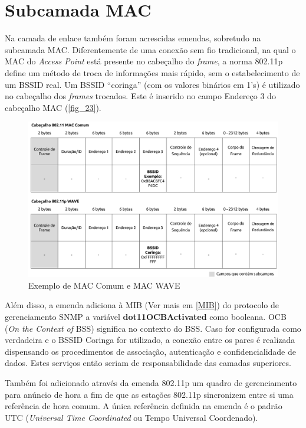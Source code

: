 \documentclass[
12pt,				%
openright,			%
oneside,			%
a4paper,			%
brazil,				%
]{abntex2}
\begin{document}
	\section{Subcamada MAC}
	
	\par Na camada de enlace também foram acrescidas emendas, sobretudo na subcamada MAC. Diferentemente de uma conexão sem fio tradicional, na qual o MAC do \textit{Access Point} está presente no cabeçalho do \textit{frame}, a norma 802.11p define um método de troca de informações mais rápido, sem o estabelecimento de um BSSID real. Um BSSID “coringa” (com os valores binários em 1’s) é utilizado no cabeçalho dos \textit{frames} trocados. Este é inserido no campo Endereço 3 do cabeçalho MAC (\autoref{fig_23}). 
	
	\begin{figure} [H]
		\centering
		\includegraphics[scale=.38]{figuras/cap3/23ExemploMACComumMACWAVE}
		\caption{\label{fig_23}Exemplo de MAC Comum e MAC WAVE}
	\end{figure}

	
	\par Além disso, a emenda adiciona à MIB (Ver mais em \autoref{MIB}) do protocolo de gerenciamento SNMP a variável \textbf{dot11OCBActivated} como booleana. OCB (\textit{On the Context of} BSS) significa no contexto do BSS. Caso for configurada como verdadeira e o BSSID Coringa for utilizado, a conexão entre os pares é realizada dispensando os procedimentos de associação, autenticação e confidencialidade de dados. Estes serviços então seriam de responsabilidade das camadas superiores.
	
	\par Também foi adicionado através da emenda 802.11p um quadro de gerenciamento para anúncio de hora a fim de que as estações 802.11p sincronizem entre si uma referência de hora comum. A única referência definida na emenda é o padrão UTC (\textit{Universal Time Coordinated} ou Tempo Universal Coordenado).
	
\end{document}
